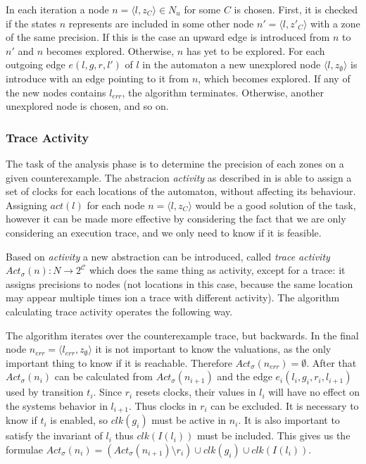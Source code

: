 In each iteration a node $n=\langle l, z_{C} \rangle \in N_u$ for some $C$ is chosen. First, it is checked if the states $n$ represents are included in some other node $n'=\langle l, z'_{C} \rangle$ with a zone of the same precision. If this is the case an upward edge is introduced from $n$ to $n'$ and $n$ becomes explored. Otherwise, $n$ has yet to be explored. For each outgoing edge $e(l,g,r,l')$ of $l$ in the automaton a new unexplored node $\langle l, z_{\emptyset} \rangle$ is introduce with an edge pointing to it from $n$, which becomes explored. If any of the new nodes contains $l_{err}$, the algorithm terminates. Otherwise, another unexplored node is chosen, and so on.



\subsubsection{Trace Activity}

The task of the analysis phase is to determine the precision of each zones on a given counterexample. The abstracion \emph{activity} as described in  is able to assign a set of clocks for each locations of the automaton, without affecting its behaviour. Assigning $act(l)$ for each node $n=\langle l, z_{C} \rangle$ would be a good solution of the task, however it can be made more effective by considering the fact that we are only considering an execution trace, and we only need to know if it is feasible.

Based on \emph{activity} a new abstraction can be introduced, called \emph{trace activity} $Act_\sigma(n): N \to 2^\mathcal{C}$ which does the same thing as activity, except for a trace: it assigns precisions to nodes (not locations in this case, because the same location may appear multiple times ion a trace with different activity). The algorithm calculating trace activity operates the following way.

The algorithm iterates over the counterexample trace, but backwards. In the final node  $n_{err}=\langle l_{err}, z_{\emptyset} \rangle$ it is not important to know the valuations, as the only important thing to know if it is reachable. Therefore $Act_\sigma(n_{err})=\emptyset$. After that $Act_\sigma(n_i)$ can be calculated from $Act_\sigma(n_{i+1})$ and the edge $e_i(l_i,g_i,r_i,l_{i+1})$ used by transition $t_i$. Since $r_i$ resets clocks, their values in $l_i$ will have no effect on the systems behavior in $l_{i+1}$. Thus clocks in $r_i$ can be excluded. It is necessary to know if $t_i$ is enabled, so $clk(g_i)$ must be active in $n_i$. It is also important to satisfy the invariant of $l_i$ thus $clk(I(l_i))$ must be included. This gives us the formulae $Act_\sigma(n_i)=(Act_\sigma(n_{i+1}) \setminus r_i) \cup clk(g_i) \cup clk(I(l_i))$. 

